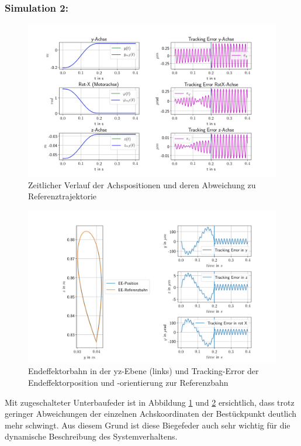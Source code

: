 \documentclass[10pt,a4paper]{iace.report}
\begin{document}
			 \subsubsection{\textcolor{blue!60!black}{Simulation 2:}}\leavevmode
				\begin{figure}[!h]
					\centering
					\includegraphics[width=0.99\linewidth]{./pics/posVerlaufAchsen_nurZ.png}
					\caption{Zeitlicher Verlauf der Achspositionen und deren Abweichung zu Referenztrajektorie}
					\label{fig:sim2pos}
				\end{figure}
				\begin{figure}[!h]
					\centering
					\includegraphics[width=0.99\linewidth]{./pics/endeffektor_nurZ.png}
					\caption{Endeffektorbahn in der yz-Ebene (links) und Tracking-Error der Endeffektorposition und -orientierung zur Referenzbahn}
					\label{fig:sim2ee}
				\end{figure}
				Mit zugeschalteter Unterbaufeder ist in Abbildung \ref{fig:sim2pos} und \ref{fig:sim2ee} ersichtlich, dass trotz geringer Abweichungen der einzelnen Achskoordinaten der Bestückpunkt deutlich mehr schwingt. Aus diesem Grund ist diese Biegefeder auch sehr wichtig für die dynamische Beschreibung des Systemverhaltens.
\end{document}
